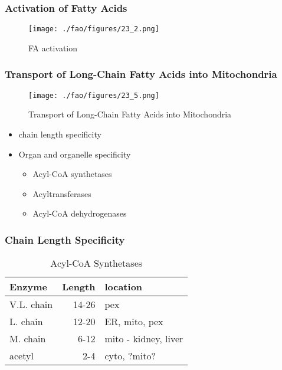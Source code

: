 \documentclass{scrartcl}
\begin{document}
\subsubsection{Activation of Fatty Acids}
\label{sec:org9c566dd}
\begin{figure}[htbp]
\centering
\texttt{[image: ./fao/figures/23\_2.png]}
\caption{\label{fig:orga364cf8}
FA activation}
\end{figure}

\subsubsection{Transport of Long-Chain Fatty Acids into Mitochondria}
\label{sec:org747533e}
\begin{figure}[htbp]
\centering
\texttt{[image: ./fao/figures/23\_5.png]}
\caption{\label{fig:org5df7ca3}
Transport of Long-Chain Fatty Acids into Mitochondria}
\end{figure}

\begin{itemize}
\item chain length specificity
\item Organ and organelle specificity
\begin{itemize}
\item Acyl-CoA synthetases
\item Acyltransferases
\item Acyl-CoA dehydrogenases
\end{itemize}
\end{itemize}


\subsubsection{Chain Length Specificity}
\label{sec:org3fee99a}

\begin{table}[htbp]
\caption{\label{tab:org667f1a5}
Acyl-CoA Synthetases}
\centering
\begin{tabular}{lrl}
Enzyme & Length & location\\
\hline
V.L. chain & 14-26 & pex\\
L. chain & 12-20 & ER, mito, pex\\
M. chain & 6-12 & mito - kidney, liver\\
acetyl & 2-4 & cyto, ?mito?\\
\end{tabular}
\end{table}
\end{document}
